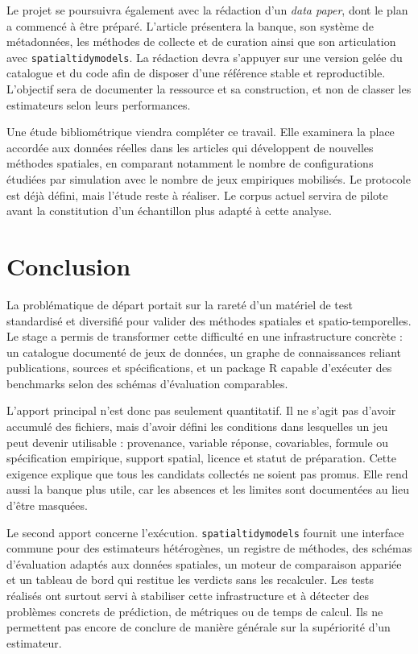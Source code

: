 \documentclass[11pt,a4paper]{article}
\begin{document}
Le projet se poursuivra également avec la rédaction d'un \textit{data paper}, dont le plan a commencé à être préparé. L'article présentera la banque, son système de métadonnées, les méthodes de collecte et de curation ainsi que son articulation avec \texttt{spatialtidymodels}. La rédaction devra s'appuyer sur une version gelée du catalogue et du code afin de disposer d'une référence stable et reproductible. L'objectif sera de documenter la ressource et sa construction, et non de classer les estimateurs selon leurs performances.

Une étude bibliométrique viendra compléter ce travail. Elle examinera la place accordée aux données réelles dans les articles qui développent de nouvelles méthodes spatiales, en comparant notamment le nombre de configurations étudiées par simulation avec le nombre de jeux empiriques mobilisés. Le protocole est déjà défini, mais l'étude reste à réaliser. Le corpus actuel servira de pilote avant la constitution d'un échantillon plus adapté à cette analyse.

\section{Conclusion}

La problématique de départ portait sur la rareté d'un matériel de test standardisé et diversifié pour valider des méthodes spatiales et spatio-temporelles. Le stage a permis de transformer cette difficulté en une infrastructure concrète : un catalogue documenté de jeux de données, un graphe de connaissances reliant publications, sources et spécifications, et un package R capable d'exécuter des benchmarks selon des schémas d'évaluation comparables.

L'apport principal n'est donc pas seulement quantitatif. Il ne s'agit pas d'avoir accumulé des fichiers, mais d'avoir défini les conditions dans lesquelles un jeu peut devenir utilisable : provenance, variable réponse, covariables, formule ou spécification empirique, support spatial, licence et statut de préparation. Cette exigence explique que tous les candidats collectés ne soient pas promus. Elle rend aussi la banque plus utile, car les absences et les limites sont documentées au lieu d'être masquées.

Le second apport concerne l'exécution. \texttt{spatialtidymodels} fournit une interface commune pour des estimateurs hétérogènes, un registre de méthodes, des schémas d'évaluation adaptés aux données spatiales, un moteur de comparaison appariée et un tableau de bord qui restitue les verdicts sans les recalculer. Les tests réalisés ont surtout servi à stabiliser cette infrastructure et à détecter des problèmes concrets de prédiction, de métriques ou de temps de calcul. Ils ne permettent pas encore de conclure de manière générale sur la supériorité d'un estimateur.
\end{document}
